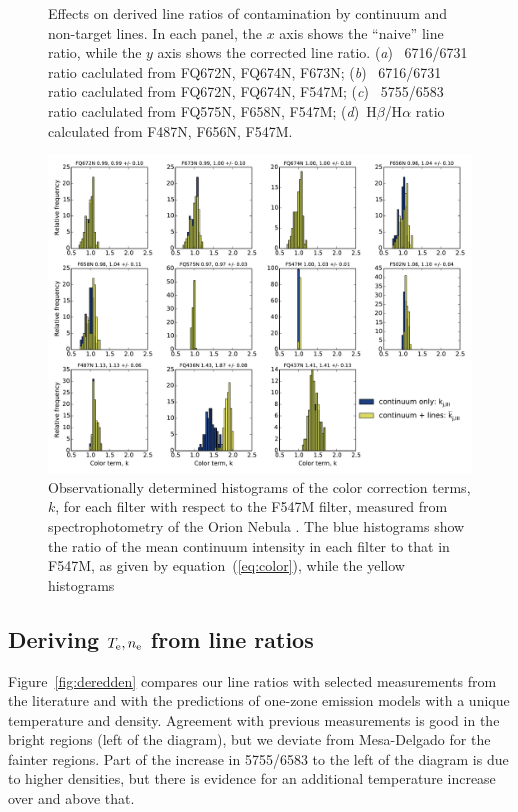 \documentclass[preprint]{aastex}
\begin{document}
\begin{figure}
\begin{tabular}{ll}
  \end{tabular}
  \caption{Effects on derived line ratios of contamination by
    continuum and non-target lines.  In each panel, the \(x\) axis
    shows the ``naive'' line ratio, while the \(y\) axis shows the
    corrected line ratio.  (\textit{a})~\sii{} 6716/6731 ratio
    caclulated from FQ672N, FQ674N, F673N; (\textit{b})~\sii{} 6716/6731 ratio
    caclulated from FQ672N, FQ674N, F547M; (\textit{c})~\nii{} 5755/6583 ratio
    caclulated from  FQ575N, F658N, F547M;
    (\textit{d})~H\(\beta\)/H\(\alpha\) ratio calculated from F487N,
    F656N, F547M.}
  \label{fig:contam}
\end{figure}

\begin{figure}
  \centering
  \includegraphics[width=\linewidth]{odh-k-color-histograms}
  \caption{Observationally determined histograms of the color
    correction terms, \(k\), for each filter with respect to the F547M
    filter, measured from spectrophotometry of the Orion Nebula
    \citep{ODell:2010a}.  The blue histograms show the ratio of the
    mean continuum intensity in each filter to that in F547M, as given
    by equation~(\ref{eq:color}), while the yellow histograms }
  \label{fig:color-correction}
\end{figure}


\subsection{\boldmath Deriving \(T_{\mathrm{e}}, n_{\mathrm{e}}\) from line ratios}
\label{sec:derive}

Figure~\ref{fig:deredden} compares our line ratios with selected
measurements from the literature and with the predictions of one-zone
emission models with a unique temperature and density.  Agreement with
previous measurements is good in the bright regions (left of the
diagram), but we deviate from Mesa-Delgado for the fainter regions.
Part of the increase in 5755/6583 to the left of the diagram is due to
higher densities, but there is evidence for an additional temperature
increase over and above that.
\end{document}
